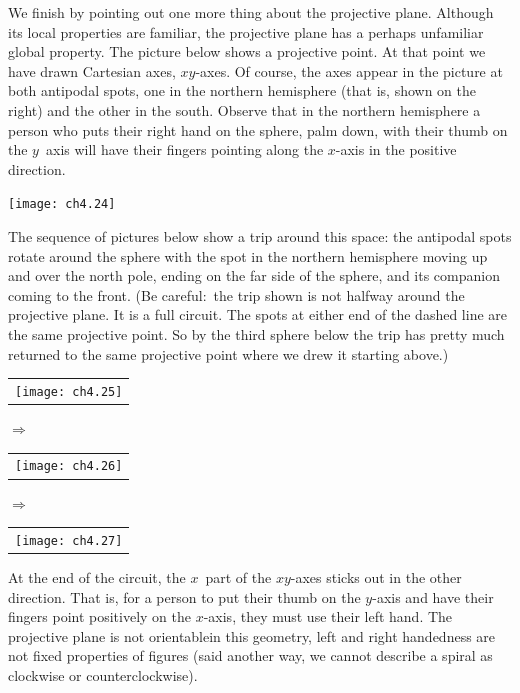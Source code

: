 We finish by pointing out one more thing about the projective plane. 
Although its local properties are familiar, the projective plane has
a perhaps unfamiliar global property.
The picture below shows a projective point.
At that point we have drawn Cartesian axes, $xy$-axes.
Of course, the axes appear in the picture at both antipodal spots, one in the
northern hemisphere (that is, shown on the right) 
and the other in the
south.
Observe that
in the northern hemisphere a person who puts 
their right hand on the sphere, palm down, with their thumb on the
$y$~axis will have their fingers pointing 
along the $x$-axis in the 
positive direction.
\begin{center}
  \texttt{[image: ch4.24]}
\end{center}
The sequence of pictures below 
show a trip around this space: 
the antipodal spots rotate around the sphere with the spot in the 
northern hemisphere moving up and over the north pole, ending on the
far side of the sphere, and its companion coming to the front.
(Be careful:~the trip shown is not halfway around the projective plane.
It is a full circuit.
The spots at either end of the dashed line are the same 
projective point.
So by the third sphere below the trip has pretty much returned 
to the same projective point where we drew it starting above.) 
\begin{center}
  \begin{tabular}{@{}c@{}}\texttt{[image: ch4.25]}\end{tabular}
\qquad\mbox{$\Longrightarrow$}\qquad
  \begin{tabular}{@{}c@{}}\texttt{[image: ch4.26]}\end{tabular}
\qquad\mbox{$\Longrightarrow$}\qquad
  \begin{tabular}{@{}c@{}}\texttt{[image: ch4.27]}\end{tabular}
\end{center}
At the end of the circuit, 
the $x$~part of the $xy$-axes sticks out in the other direction.
That is, for a person to put their thumb on the $y$-axis and 
have their fingers point positively on the $x$-axis, they must
use their left hand.
The projective plane is not orientable\Dash in this geometry,
left and right handedness are not fixed properties of figures
(said another way, 
we cannot describe a spiral as clockwise or
counterclockwise).

